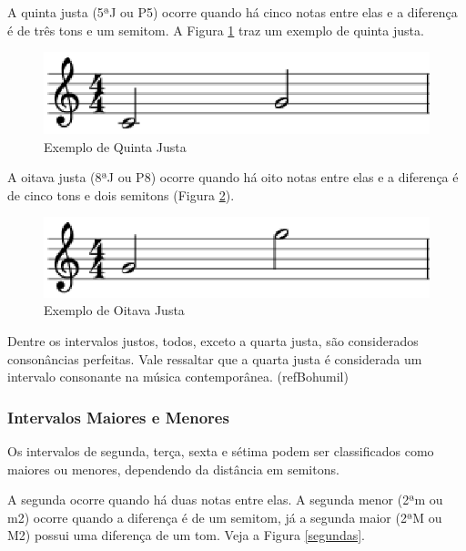         A quinta justa (5ªJ ou P5) ocorre quando há cinco notas entre elas e a diferença é de três tons e um semitom. A Figura \ref{quintajusta} traz um exemplo de quinta justa.

        \begin{figure}[htb]
          \centering
          \includegraphics[scale=0.6]{figuras/quintajusta.eps}
          \caption{Exemplo de Quinta Justa}
          \label{quintajusta}
        \end{figure}

        A oitava justa (8ªJ ou P8) ocorre quando há oito notas entre elas e a diferença é de cinco tons e dois semitons (Figura \ref{oitavajusta}).

        \begin{figure}[htb]
          \centering
          \includegraphics[scale=0.6]{figuras/oitavajusta.eps}
          \caption{Exemplo de Oitava Justa}
          \label{oitavajusta}
        \end{figure}

        Dentre os intervalos justos, todos, exceto a quarta justa, são considerados consonâncias perfeitas. Vale ressaltar que a quarta justa é considerada um intervalo consonante na música contemporânea. (refBohumil)

      \subsubsection[Intervalos Maiores e Menores]{Intervalos Maiores e Menores}

        Os intervalos de segunda, terça, sexta e sétima podem ser classificados como maiores ou menores, dependendo da distância em semitons.

        A segunda ocorre quando há duas notas entre elas. A segunda menor (2ªm ou m2) ocorre quando a diferença é de um semitom, já a segunda maior (2ªM ou M2) possui uma diferença de um tom. Veja a Figura \ref{segundas}.


